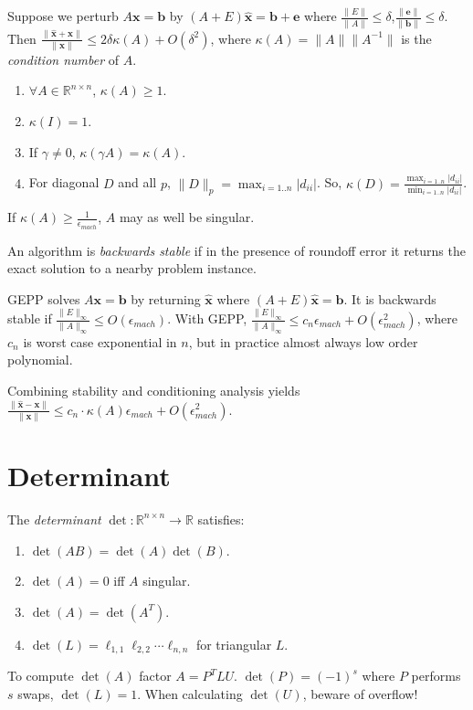 \documentclass[landscape,10pt,letterpaper]{article}
\newcommand{\heading}[1]{\vspace{-1.5em} \section*{#1} \vspace{-1.0em}}
\begin{document}
\begin{multicols}{4}
Suppose we perturb $A \mathbf{x} = \mathbf{b}$ by $(A+E)\mathbf{\hat{x}} = \mathbf{b} + \mathbf{e}$ where $\frac{\|E\|}{\|A\|} \leq \delta$,$\frac{\|\mathbf{e}\|}{\|\mathbf{b}\|} \leq \delta$.  Then $\frac{\| \mathbf{\hat{x}} + \mathbf{x}\|}{\| \mathbf{x} \|} \leq 2 \delta \kappa(A) + O(\delta^2)$, where $\kappa(A) = \|A\| \|A^{-1}\|$ is the \emph{condition number} of $A$.
\vspace{-0.7em} \begin{multicols}{2}
\begin{enumerate}[topsep=0pt, partopsep=0pt, itemsep=-4pt]
\item $\forall A \in \mathbb{R}^{n \times n}$, $\kappa(A) \geq 1$.
\item $\kappa(I) = 1$.
\item If $\gamma \neq 0$, $\kappa(\gamma A) = \kappa(A)$.
\item For diagonal $D$ and all $p$, $\| D \|_p = \max_{i=1..n} | d_{ii} |$.  So, $\kappa(D) = \frac{\max_{i=1..n} | d_{ii} |}{\min_{i=1..n} | d_{ii} |}$.
\end{enumerate}
\end{multicols}
\vspace{-1.0em}
If $\kappa(A) \geq \frac{1}{\epsilon_{mach}}$, $A$ may as well be singular.

An algorithm is \emph{backwards stable} if in the presence of roundoff error it returns the exact solution to a nearby problem instance.

GEPP solves $A \mathbf{x} = \mathbf{b}$ by returning $\mathbf{\hat{x}}$ where $(A+E)\mathbf{\hat{x}} = \mathbf{b}$.  It is backwards stable if $\frac{\|E\|_\infty}{\|A\|_\infty} \leq O(\epsilon_{mach})$.  With GEPP, $\frac{\|E\|_\infty}{\|A\|_\infty} \leq c_n \epsilon_{mach} + O(\epsilon_{mach}^2)$, where $c_n$ is worst case exponential in $n$, but in practice almost always low order polynomial.

Combining stability and conditioning analysis yields
$\frac{\| \mathbf{\hat{x}} - \mathbf{x} \|}{\| \mathbf{x} \|} \leq c_n \cdot \kappa(A) \epsilon_{mach} + O(\epsilon_{mach}^2)$.

\heading{Determinant}

The \emph{determinant} $\det : \mathbb{R}^{n \times n} \to \mathbb{R}$ satisfies:
\vspace{-0.9em}
\begin{multicols}{2}
\begin{enumerate}[topsep=0pt, partopsep=0pt, itemsep=-4pt]
\item $\det(AB) = \det(A)\det(B)$.
\item $\det(A) = 0$ iff $A$ singular.
\item $\det(A) = \det(A^T)$.
\item $\det(L) = \ell_{1,1} \ell_{2,2} \cdots \ell_{n,n}$ for triangular $L$.
\end{enumerate}
\end{multicols}
\vspace{-1.0em}
To compute $\det(A)$ factor $A=P^TLU$.  $\det(P) = (-1)^s$ where $P$ performs $s$ swaps, $\det(L)=1$.  When calculating $\det(U)$, beware of overflow!


\end{multicols}
\end{document}
